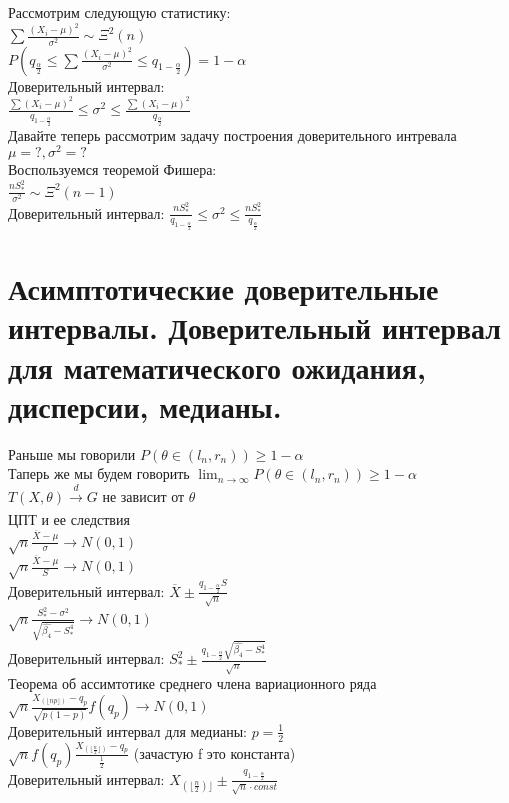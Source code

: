 \documentclass{article}
\newcommand\0{\mathbb{0}}
\newcommand\1{\mathbb{1}}
\newcommand{\xrto}{\xrightarrow}
\begin{document}
Рассмотрим следующую статистику:\\
$\displaystyle\sum \frac{(X_i - \mu)^2}{\sigma^2} \sim \Xi^2(n)$\\
$P(q_{\frac{\alpha}{2}} \leq \displaystyle\sum \frac{(X_i - \mu)^2}{\sigma^2} \leq q_{1 - \frac{\alpha}{2}}) = 1 - \alpha$\\
Доверительный интервал:\\
$\frac{\displaystyle\sum (X_i - \mu)^2}{q_{1 - \frac{\alpha}{2}}} \leq  \sigma^2 \leq \frac{\displaystyle\sum(X_i - \mu)^2}{q_{\frac{\alpha}{2}}}$\\
Давайте теперь рассмотрим задачу построения доверительного интревала $\mu = ?, \sigma^2 = ?$\\
Воспользуемся теоремой Фишера:\\
$\frac{n S_*^2}{\sigma^2} \sim \Xi^2(n - 1)$\\
Доверительный интервал: $\frac{n S_*^2}{q_{1 - \frac{\alpha}{2}}} \leq \sigma^2 \leq \frac{n S_*^2}{q_{\frac{\alpha}{2}}}$\\
\section{Асимптотические доверительные интервалы. Доверительный интервал для математического
ожидания, дисперсии, медианы.}
Раньше мы говорили $P(\theta \in (l_n, r_n)) \geq 1 - \alpha$\\
Таперь же мы будем говорить $\lim_{n \to \infty} P(\theta \in (l_n, r_n)) \geq 1 - \alpha$\\
$T(X, \theta) \xrto[]{d} G$ не зависит от $\theta$\\
ЦПТ и ее следствия\\
$\sqrt{n}\frac{\overline{X} - \mu}{\sigma} \to N(0, 1)$\\
$\sqrt{n}\frac{\overline{X} - \mu}{S} \to N(0, 1)$\\
Доверительный интервал: $\overline{X} \pm \frac{q_{1 - \frac{\alpha}{2}}S}{\sqrt{n}}$\\
$\sqrt{n}\frac{S_*^2 - \sigma^2}{\sqrt{\widehat{\beta_4} - S_*^4}} \to N(0, 1)$\\
Доверительный интервал: $S_*^2 \pm \frac{q_{1 - \frac{\alpha}{2}}\sqrt{\widehat{\beta_4} - S_*^4}}{\sqrt{n}}$\\
Теорема об ассимтотике среднего члена вариационного ряда\\
$\sqrt{n}\frac{X_{(\lfloor np \rfloor)} - q_p}{\sqrt{p(1 - p)}} f(q_p) \to N(0, 1)$\\
Доверительный интервал для медианы: $p = \frac{1}{2}$\\
$\sqrt{n}f(q_p)\frac{X_{(\lfloor \frac{n}{2} \rfloor)} - q_p}{\frac{1}{2}}$ (зачастую f это константа)\\
Доверительный интервал: $X_{(\lfloor \frac{n}{2}) \rfloor} \pm \frac{q_{1 - \frac{\alpha}{2}}}{\sqrt{n} \cdot const}$\\
\end{document}
